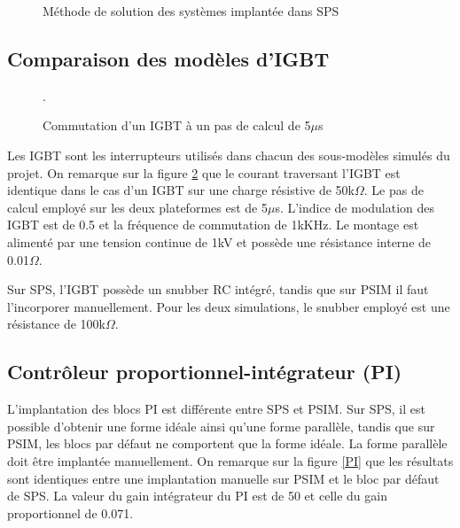 \begin{figure}
\caption{Méthode de solution des systèmes implantée dans SPS}
\label{fig_solving_SPS}
\end{figure}

\subsection{Comparaison des modèles d'IGBT}

\begin{figure}[htb]
\caption{Commutation d'un IGBT à un pas de calcul de 5$\mu$s}.
\label{IG}
\end{figure}

Les IGBT sont les interrupteurs utilisés dans chacun des sous-modèles simulés du projet. On remarque sur la figure \ref{IG} que le  courant traversant l'IGBT est identique dans le cas d'un IGBT sur une charge résistive de 50k$\Omega$. Le pas de calcul employé sur les deux plateformes est de 5$\mu$s. L'indice de modulation des IGBT est de 0.5 et la fréquence de commutation de 1kKHz. Le montage est alimenté par une tension continue de 1kV et possède une résistance interne de 0.01$\Omega$. 

Sur SPS, l'IGBT possède un snubber RC intégré, tandis que sur PSIM il faut l'incorporer manuellement. Pour les deux simulations, le snubber employé est une résistance de 100k$\Omega$.
 
\subsection{Contrôleur proportionnel-intégrateur (PI)}
L'implantation des blocs PI est différente entre SPS et PSIM. Sur SPS, il est possible d'obtenir une forme idéale ainsi qu'une forme parallèle, tandis que sur PSIM, les blocs par défaut ne comportent que la forme idéale. La forme parallèle doit être implantée manuellement. On remarque sur la figure \ref{PI} que les résultats sont identiques entre une implantation manuelle sur PSIM et le bloc par défaut de SPS. La valeur du gain intégrateur du PI est de 50 et celle du gain proportionnel de 0.071. 

